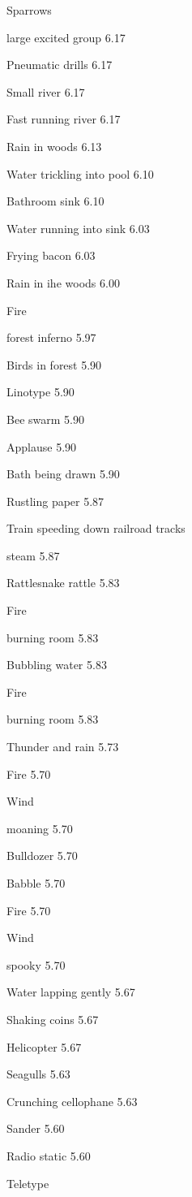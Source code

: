 \documentclass{sig-alternate-05-2015}
\begin{document}
{ Sparrows 

 large excited group
6.17 

 Pneumatic drills
6.17 

 Small river
6.17 

 Fast running river
6.17 

 Rain in woods
6.13 

 Water trickling into pool
6.10 

 Bathroom sink
6.10 

 Water running into sink
6.03 

 Frying bacon
6.03 

 Rain in ihe woods
6.00 

 Fire 

 forest inferno
5.97 

 Birds in forest
5.90 

 Linotype
5.90 

 Bee swarm
5.90 

 Applause
5.90 

 Bath being drawn
5.90 

 Rustling paper
5.87 

 Train speeding down railroad tracks 

 steam
5.87 

 Rattlesnake rattle
5.83 

 Fire 

 burning room
5.83 

 Bubbling water
5.83 

 Fire 

 burning room
5.83 

 Thunder and rain
5.73 

 Fire
5.70 

 Wind 

 moaning
5.70 

 Bulldozer
5.70 

 Babble
5.70 

 Fire
5.70 

 Wind 

 spooky
5.70 

 Water lapping gently
5.67 

 Shaking coins
5.67 

 Helicopter
5.67 

 Seagulls
5.63 

 Crunching cellophane
5.63 

 Sander
5.60 

 Radio static
5.60 

 Teletype 

}
\end{document}
